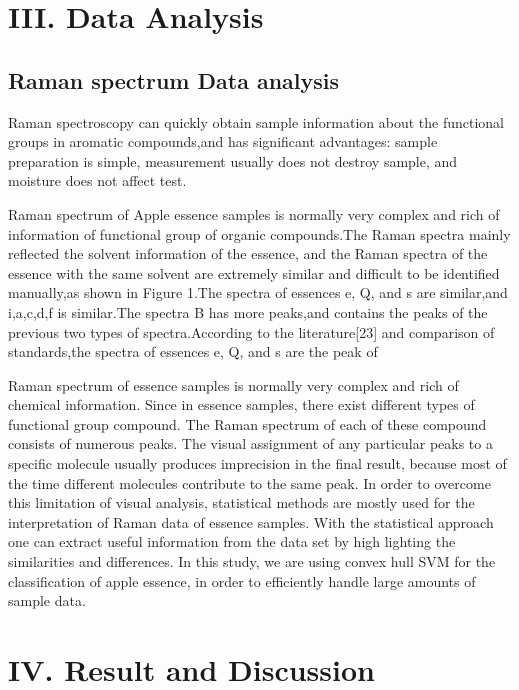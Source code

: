\documentclass[a4paper]{article}
\begin{document}
\section{III. Data Analysis}


\subsection{Raman spectrum Data analysis}
Raman spectroscopy can quickly obtain sample information about the functional groups in aromatic compounds,and has significant advantages: sample preparation is simple, measurement usually does not destroy sample, and moisture does not affect test.

Raman spectrum of Apple essence samples is normally very complex and rich of information of functional group of organic compounds.The Raman spectra mainly reflected the solvent information of the essence, and the Raman spectra of the essence with the same solvent are extremely similar and difficult to be identified manually,as shown in Figure 1.The spectra of essences e, Q, and s are similar,and i,a,c,d,f is similar.The spectra B has more peaks,and contains the peaks of the previous two types of spectra.According to the literature[23] and comparison of standards,the spectra of essences e, Q, and s are the peak of

Raman  spectrum  of  essence samples  is  normally  very  complex  and  rich  of  chemical information.  Since  in essence  samples,  there  exist  different  types  of  functional group compound. The Raman spectrum of each of these compound consists of  numerous peaks.  The  visual  assignment  of  any  particular  peaks  to  a  specific  molecule usually  produces  imprecision  in  the  final  result,  because  most  of  the  time  different molecules  contribute  to  the  same  peak.  In  order  to  overcome  this  limitation  of  visual analysis, statistical methods are mostly used for the interpretation of Raman data of essence samples. With the statistical approach one can extract useful information from the data set by high  lighting  the  similarities  and differences.  In  this  study,  we  are using convex hull SVM  for  the  classification of  apple essence,  in order to efficiently handle large amounts of sample data.
\section{IV. Result and Discussion}
\end{document}
